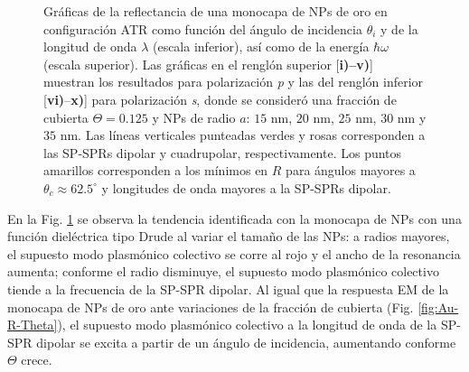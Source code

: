 \begin{figure}[t!]
\vspace*{-.5em}
	\caption{Gráficas de la reflectancia de una monocapa de NPs de oro en configuración ATR como función del ángulo de incidencia $\theta_i$ y de la longitud de onda $\lambda$ (escala inferior), así como de la energía  $\hbar\omega$ (escala superior).  Las gráficas   en el renglón superior [\textbf{i)--v)}] muestran los resultados para  polarización \emph{p} y las del renglón inferior  [\textbf{vi)}--\textbf{x)}]  para polarización  \emph{s}, donde se consideró una fracción de cubierta $\Theta = 0.125$ y  NPs de radio  $a$: $15$ nm, $20$ nm, $25$ nm, $30$ nm y $35$ nm.  Las líneas verticales punteadas verdes y rosas corresponden a las SP-SPRs dipolar y  cuadrupolar, respectivamente.  Los puntos amarillos corresponden a los mínimos en $R$ para ángulos mayores a $\theta_c\approx 62.5^\circ$ y longitudes de onda mayores a la SP-SPRs dipolar.}	\label{fig:Au-R-Rad}	
	\end{figure}	

En la Fig. \ref{fig:Au-R-Rad} se observa la tendencia identificada con la monocapa de NPs con una función dieléctrica tipo Drude al variar el tamaño de las NPs: a radios mayores, el supuesto modo plasmónico colectivo se corre al rojo y el ancho de la resonancia aumenta; conforme el radio disminuye, el supuesto modo plasmónico colectivo tiende a la frecuencia de la SP-SPR dipolar. Al igual que la respuesta EM de la monocapa de NPs de oro ante variaciones de la fracción de cubierta (Fig. \ref{fig:Au-R-Theta}),  el supuesto modo plasmónico colectivo a la longitud de onda de la SP-SPR dipolar se excita a partir de un ángulo de incidencia, aumentando conforme $\Theta$ crece.%

